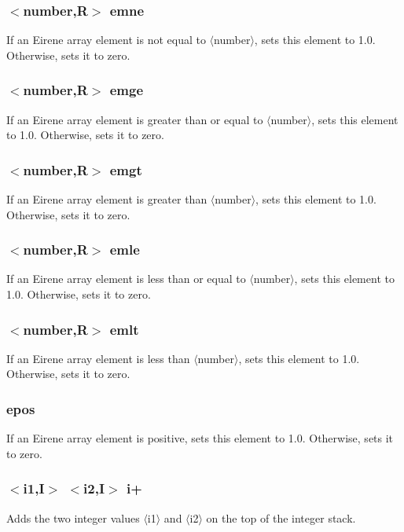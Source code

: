 \documentclass[a4paper,10pt]{report}
\begin{document}
\subsubsection{$<$number,{\bf R}$>$ emne}\label{sec:emne}
If an Eirene array element is not equal to $\langle$number$\rangle$, sets this element to 1.0.
Otherwise, sets it to zero.

\subsubsection{$<$number,{\bf R}$>$ emge}\label{sec:emge}
If an Eirene array element is greater than or equal to $\langle$number$\rangle$, sets this element to 1.0.
Otherwise, sets it to zero.

\subsubsection{$<$number,{\bf R}$>$ emgt}\label{sec:emgt}
If an Eirene array element is greater than $\langle$number$\rangle$, sets this element to 1.0.
Otherwise, sets it to zero.

\subsubsection{$<$number,{\bf R}$>$ emle}\label{sec:emle}
If an Eirene array element is less than or equal to $\langle$number$\rangle$, sets this element to 1.0.
Otherwise, sets it to zero.

\subsubsection{$<$number,{\bf R}$>$ emlt}\label{sec:emlt}
If an Eirene array element is less than $\langle$number$\rangle$, sets this element to 1.0.
Otherwise, sets it to zero.

\subsubsection{epos}\label{sec:epos}
If an Eirene array element is positive, sets this element to 1.0.
Otherwise, sets it to zero.

\subsubsection{$<$i1,{\bf I}$>$ $<$i2,{\bf I}$>$ i+}\label{sec:i+}
Adds the two integer values $\langle$i1$\rangle$ and $\langle$i2$\rangle$ on the top of the integer stack.
\end{document}
